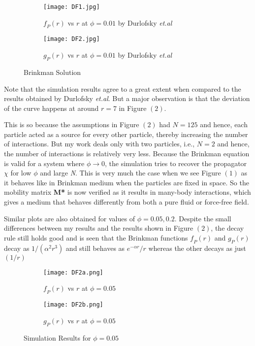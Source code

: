 \documentclass[12pt]{article}
\begin{document}
\begin{figure}[ht]
\begin{subfigure}{.5\textwidth}
  \centering
  \texttt{[image: DF1.jpg]}  
  \caption{$\textit{f}_P(r)$ vs $r$ at $\phi=0.01$ by Durlofsky \textit{et.al}}
\end{subfigure}
\begin{subfigure}{.5\textwidth}
  \centering
  \texttt{[image: DF2.jpg]}  
  \caption{$\textit{g}_P(r)$ vs $r$ at $\phi=0.01$ by Durlofsky \textit{et.al}}
\end{subfigure}
\caption{Brinkman Solution}
\end{figure}

Note that the simulation results agree to a great extent when compared to the results obtained by Durlofsky \textit{et.al}. But a major observation is that the deviation of the curve happens at around $r=7$ in Figure $(2)$.


This is so because the assumptions in Figure $(2)$ had $N=125$ and hence, each particle acted as a source for every other particle, thereby increasing the number of interactions. But my work deals only with two particles, i.e., $N=2$ and hence, the number of interactions is relatively very less. Because the Brinkman equation is valid for a system where $\phi\rightarrow 0$, the simulation tries to recover the propagator $\chi$ for low $\phi$ and large \textit{N}. This is very much the case when we see Figure $(1)$ as it behaves like in Brinkman medium when the particles are fixed in space. So the mobility matrix \textbf{M*} is now verified as it results in many-body interactions, which gives a medium that behaves differently from both a pure fluid or force-free field. 

Similar plots are also obtained for values of $\phi=0.05, 0.2$. Despite the small differences between my results and the results shown in Figure $(2)$, the decay rule still holds good and is seen that the Brinkman functions $\textit{f}_P(r)$ and $\textit{g}_{P}(r)$ decay as $1/(\alpha^2 r^3)$ and still behaves as $e^{-\alpha r}/r$ whereas the other decays as just $(1/r)$


\begin{figure}[ht]
\begin{subfigure}{.5\textwidth}
  \centering
  \texttt{[image: DF2a.png]}  
  \caption{$\textit{f}_P(r)$ vs $r$ at $\phi=0.05$}
\end{subfigure}
\begin{subfigure}{.5\textwidth}
  \centering
  \texttt{[image: DF2b.png]}  
  \caption{$\textit{g}_P(r)$ vs $r$ at $\phi=0.05$}
\end{subfigure}
\caption{Simulation Results for $\phi=0.05$}
\end{figure}
\end{document}
